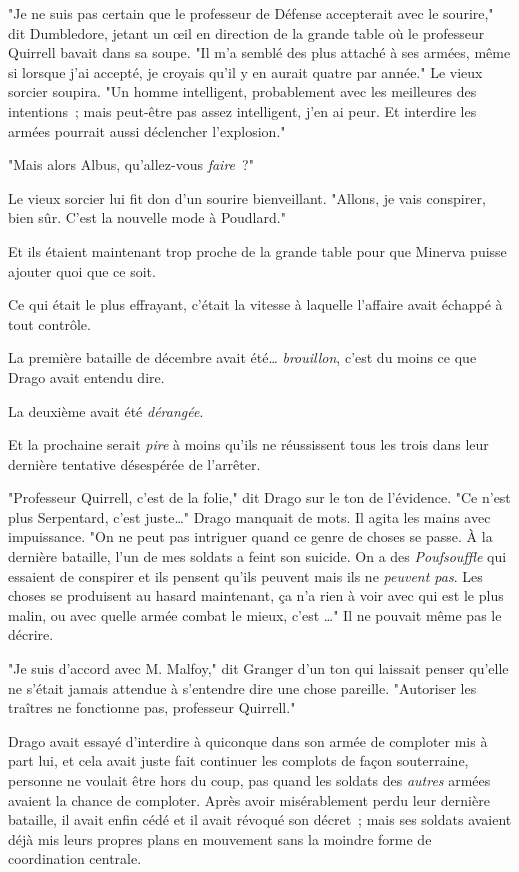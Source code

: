 "Je ne suis pas certain que le professeur de Défense accepterait avec le sourire," dit Dumbledore, jetant un œil en direction de la grande table où le professeur Quirrell bavait dans sa soupe. "Il m'a semblé des plus attaché à ses armées, même si lorsque j'ai accepté, je croyais qu'il y en aurait quatre par année." Le vieux sorcier soupira. "Un homme intelligent, probablement avec les meilleures des intentions~; mais peut-être pas assez intelligent, j'en ai peur. Et interdire les armées pourrait aussi déclencher l'explosion."

"Mais alors Albus, qu'allez-vous \emph{faire}~?"

Le vieux sorcier lui fit don d'un sourire bienveillant. "Allons, je vais conspirer, bien sûr. C'est la nouvelle mode à Poudlard."

Et ils étaient maintenant trop proche de la grande table pour que Minerva puisse ajouter quoi que ce soit.

\later

Ce qui était le plus effrayant, c'était la vitesse à laquelle l'affaire avait échappé à tout contrôle.

La première bataille de décembre avait été… \emph{brouillon}, c'est du moins ce que Drago avait entendu dire.

La deuxième avait été \emph{dérangée}.

Et la prochaine serait \emph{pire} à moins qu'ils ne réussissent tous les trois dans leur dernière tentative désespérée de l'arrêter.

"Professeur Quirrell, c'est de la folie," dit Drago sur le ton de l'évidence. "Ce n'est plus Serpentard, c'est juste…" Drago manquait de mots. Il agita les mains avec impuissance. "On ne peut pas intriguer quand ce genre de choses se passe. À la dernière bataille, l'un de mes soldats a feint son suicide. On a des \emph{Poufsouffle} qui essaient de conspirer et ils pensent qu'ils peuvent mais ils ne \emph{peuvent pas}. Les choses se produisent au hasard maintenant, ça n'a rien à voir avec qui est le plus malin, ou avec quelle armée combat le mieux, c'est …" Il ne pouvait même pas le décrire.

"Je suis d'accord avec M. Malfoy," dit Granger d'un ton qui laissait penser qu'elle ne s'était jamais attendue à s'entendre dire une chose pareille. "Autoriser les traîtres ne fonctionne pas, professeur Quirrell."

Drago avait essayé d'interdire à quiconque dans son armée de comploter mis à part lui, et cela avait juste fait continuer les complots de façon souterraine, personne ne voulait être hors du coup, pas quand les soldats des \emph{autres} armées avaient la chance de comploter. Après avoir misérablement perdu leur dernière bataille, il avait enfin cédé et il avait révoqué son décret~; mais ses soldats avaient déjà mis leurs propres plans en mouvement sans la moindre forme de coordination centrale.

